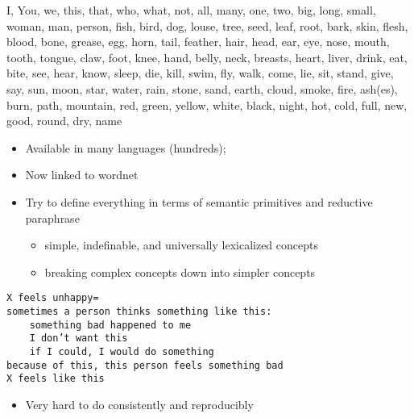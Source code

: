 \documentclass[headrule,footrule]{foils}
\begin{document}
\newpage
\vspace*{-2ex}
I, You, we, this, that, who, what, not, all, many, one, two, big,
long, small, woman, man, person, fish, bird, dog, louse, tree, seed,
leaf, root, bark, skin, flesh, blood, bone, grease, egg, horn, tail,
feather, hair, head, ear, eye, nose, mouth, tooth, tongue, claw, foot,
knee, hand, belly, neck, breasts, heart, liver, drink, eat, bite, see,
hear, know, sleep, die, kill, swim, fly, walk, come, lie, sit, stand,
give, say, sun, moon, star, water, rain, stone, sand, earth, cloud,
smoke, fire, ash(es), burn, path, mountain, red, green, yellow, white,
black, night, hot, cold, full, new, good, round, dry, name
\vspace*{-1ex}
\begin{itemize}
\item Available in many languages (hundreds); 
\item Now linked to wordnet \citep{daCosta:Bond:Kratochvil:2016}
  
\end{itemize}
\vspace*{-1ex}


\begin{itemize}
\item Try to define everything in terms of semantic primitives and reductive paraphrase
  \begin{itemize}
  \item simple, indefinable, and universally lexicalized concepts
  \item breaking complex concepts down into simpler concepts
  \end{itemize}
\end{itemize}
\begin{verbatim}
X feels unhappy=
sometimes a person thinks something like this:
    something bad happened to me
    I don’t want this	
    if I could, I would do something
because of this, this person feels something bad
X feels like this
\end{verbatim}
\begin{itemize}
\item Very hard to do consistently and reproducibly
\end{itemize}
\end{document}
